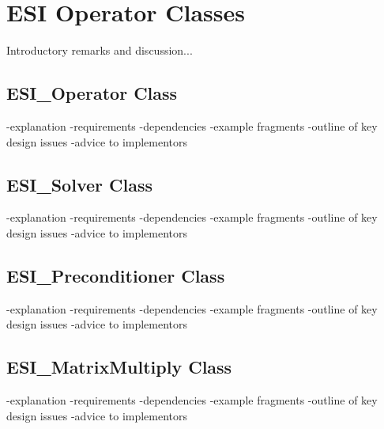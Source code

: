 \chapter{ESI Operator Classes}

Introductory remarks and discussion...

\section{ESI\_Operator Class}

-explanation
-requirements
-dependencies
-example fragments
-outline of key design issues
-advice to implementors

\section{ESI\_Solver Class}

-explanation
-requirements
-dependencies
-example fragments
-outline of key design issues
-advice to implementors

\section{ESI\_Preconditioner Class}

-explanation
-requirements
-dependencies
-example fragments
-outline of key design issues
-advice to implementors

\section{ESI\_MatrixMultiply Class}

-explanation
-requirements
-dependencies
-example fragments
-outline of key design issues
-advice to implementors
